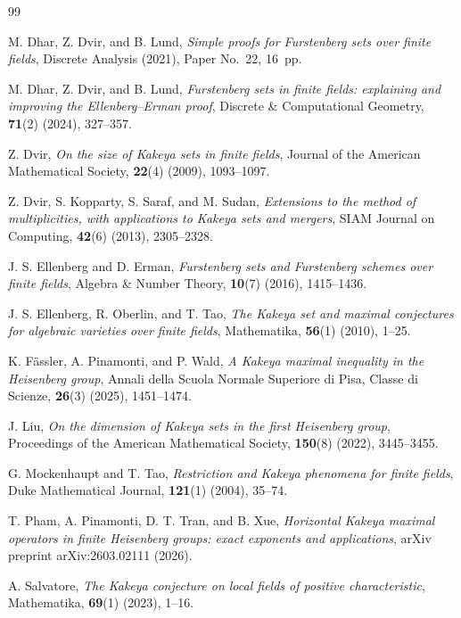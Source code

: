 \documentclass[11pt,letterpaper]{amsart}
\numberwithin{equation}{section}
\theoremstyle{definition}
\theoremstyle{remark}
\begin{document}
\raggedbottom
\begin{thebibliography}{99}

M. Dhar, Z. Dvir, and B. Lund,
\emph{Simple proofs for Furstenberg sets over finite fields},
Discrete Analysis (2021), Paper No.~22, 16~pp.

M. Dhar, Z. Dvir, and B. Lund,
\emph{Furstenberg sets in finite fields: explaining and improving the Ellenberg--Erman proof},
Discrete \& Computational Geometry, \textbf{71}(2) (2024),
327--357.

Z. Dvir,
\emph{On the size of Kakeya sets in finite fields},
Journal of the American Mathematical Society, \textbf{22}(4) (2009),
1093--1097.

Z. Dvir, S. Kopparty, S. Saraf, and M. Sudan,
\emph{Extensions to the method of multiplicities, with applications
to Kakeya sets and mergers},
SIAM Journal on Computing, \textbf{42}(6) (2013),
2305--2328.

J. S. Ellenberg and D. Erman,
\emph{Furstenberg sets and Furstenberg schemes over finite fields},
Algebra \& Number Theory, \textbf{10}(7) (2016),
1415--1436.

J. S. Ellenberg, R. Oberlin, and T. Tao,
\emph{The Kakeya set and maximal conjectures for algebraic varieties
over finite fields},
Mathematika, \textbf{56}(1) (2010),
1--25.

K. F\"assler, A. Pinamonti, and P. Wald,
\emph{A Kakeya maximal inequality in the Heisenberg group},
Annali della Scuola Normale Superiore di Pisa, Classe di Scienze,
\textbf{26}(3) (2025), 1451--1474.

J. Liu,
\emph{On the dimension of Kakeya sets in the first Heisenberg group},
Proceedings of the American Mathematical Society, \textbf{150}(8)
(2022), 3445--3455.

G. Mockenhaupt and T. Tao,
\emph{Restriction and Kakeya phenomena for finite fields},
Duke Mathematical Journal, \textbf{121}(1) (2004),
35--74.

T. Pham, A. Pinamonti, D. T. Tran, and B. Xue,
\emph{Horizontal Kakeya maximal operators in finite Heisenberg groups: exact exponents and applications},
arXiv preprint arXiv:2603.02111 (2026).

A. Salvatore,
\emph{The Kakeya conjecture on local fields of positive characteristic},
Mathematika, \textbf{69}(1) (2023),
1--16.


\end{thebibliography}
\end{document}
